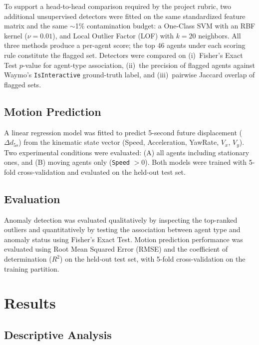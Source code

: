 \documentclass[conference]{IEEEtran}
\begin{document}
To support a head-to-head comparison required by the project rubric, two additional unsupervised detectors were fitted on the same standardized feature matrix and the same $\sim$1\% contamination budget: a One-Class SVM \cite{scholkopf2001estimating} with an RBF kernel ($\nu = 0.01$), and Local Outlier Factor (LOF) with $k = 20$ neighbors. All three methods produce a per-agent score; the top 46 agents under each scoring rule constitute the flagged set. Detectors were compared on (i)~Fisher's Exact Test $p$-value for agent-type association, (ii)~the precision of flagged agents against Waymo's \texttt{IsInteractive} ground-truth label, and (iii)~pairwise Jaccard overlap of flagged sets.

\subsection{Motion Prediction}

A linear regression model was fitted to predict 5-second future displacement ($\Delta d_{5s}$) from the kinematic state vector (Speed, Acceleration, YawRate, $V_x$, $V_y$). Two experimental conditions were evaluated: (A) all agents including stationary ones, and (B) moving agents only (\texttt{Speed} $> 0$). Both models were trained with 5-fold cross-validation and evaluated on the held-out test set.

\subsection{Evaluation}

Anomaly detection was evaluated qualitatively by inspecting the top-ranked outliers and quantitatively by testing the association between agent type and anomaly status using Fisher's Exact Test. Motion prediction performance was evaluated using Root Mean Squared Error (RMSE) and the coefficient of determination ($R^2$) on the held-out test set, with 5-fold cross-validation on the training partition.

\section{Results}

\subsection{Descriptive Analysis}
\end{document}
